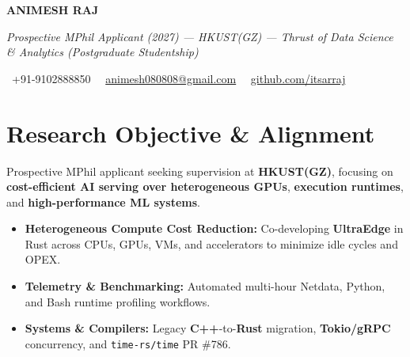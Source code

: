 \documentclass[a4paper,11pt]{article}
\newcommand{\socialicon}[1]{\raisebox{-0.05em}{\resizebox{!}{1em}{#1}}}
\newcommand{\headerfontiii}{\fontfamily{ppl}\selectfont} %
\begin{document}
\headerfontiii

\begin{center}
    {\Huge\textbf{ANIMESH RAJ}}
\end{center}
\vspace{-6mm}

\begin{center}
    {\small\textit{Prospective MPhil Applicant (2027) --- HKUST(GZ) — Thrust of Data Science \& Analytics (Postgraduate Studentship)}}
\end{center}
\vspace{-6mm}

\begin{center}
    {\small
    \socialicon{\faPhone}\ +91-9102888850 \textbar\ 
    \socialicon{\faEnvelope}\ \href{mailto:animesh080808@gmail.com}{animesh080808@gmail.com} \textbar\ 
    \socialicon{\faGithub}\ \href{https://github.com/itsarraj}{github.com/itsarraj}
    }
\end{center}
\vspace{-4mm}

\section{\textbf{Research Objective \& Alignment}}
\vspace{1mm}
{\small
Prospective MPhil applicant seeking supervision at \textbf{HKUST(GZ)}, focusing on \textbf{cost-efficient AI serving over heterogeneous GPUs}, \textbf{execution runtimes}, and \textbf{high-performance ML systems}.
\begin{itemize}[leftmargin=3ex, itemsep=0.4mm, topsep=1mm]
    \item \textbf{Heterogeneous Compute Cost Reduction:} Co-developing \textbf{UltraEdge} in Rust across CPUs, GPUs, VMs, and accelerators to minimize idle cycles and OPEX.
    \item \textbf{Telemetry \& Benchmarking:} Automated multi-hour Netdata, Python, and Bash runtime profiling workflows.
    \item \textbf{Systems \& Compilers:} Legacy \textbf{C++}-to-\textbf{Rust} migration, \textbf{Tokio/gRPC} concurrency, and \texttt{time-rs/time} PR \#786.
\end{itemize}
}
\vspace{-3mm}
\end{document}
